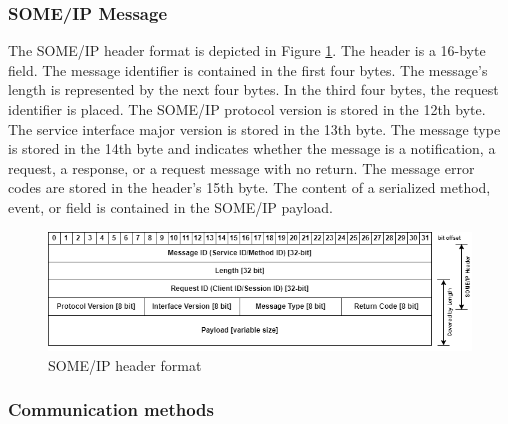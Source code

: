 \subsubsection{SOME/IP Message}
The SOME/IP header format is depicted in Figure \ref{fig:someip_header}. The header is a 16-byte field. The message identifier is contained in the first four bytes. The message's length is represented by the next four bytes. In the third four bytes, the request identifier is placed. The SOME/IP protocol version is stored in the 12th byte. The service interface major version is stored in the 13th byte. The message type is stored in the 14th byte and indicates whether the message is a notification, a request, a response, or a request message with no return. The message error codes are stored in the header's 15th byte. The content of a serialized method, event, or field is contained in the SOME/IP payload.

\begin{figure}[!htb]
	\centering
		\includegraphics[width=\textwidth]{images/someip_header_1.png}
	\caption{SOME/IP header format\cite{b_someip_spec}}
	\label{fig:someip_header}
\end{figure}


\subsubsection{Communication methods}
\label{sec:CommunicationMethods}

